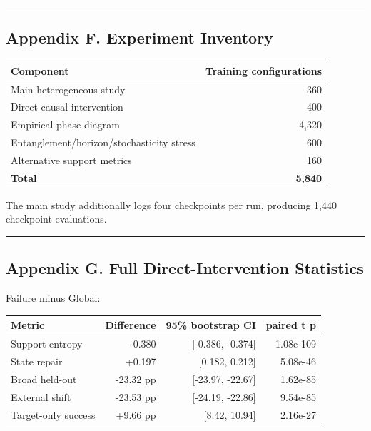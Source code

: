 \documentclass[
]{article}
\begin{document}
\begin{center}\rule{0.5\linewidth}{0.5pt}\end{center}

\subsection{Appendix F. Experiment
Inventory}\label{appendix-f.-experiment-inventory}

\begin{longtable}[]{@{}lr@{}}
\toprule\noalign{}
Component & Training configurations \\
\midrule\noalign{}
\endhead
\bottomrule\noalign{}
\endlastfoot
Main heterogeneous study & 360 \\
Direct causal intervention & 400 \\
Empirical phase diagram & 4,320 \\
Entanglement/horizon/stochasticity stress & 600 \\
Alternative support metrics & 160 \\
\textbf{Total} & \textbf{5,840} \\
\end{longtable}

The main study additionally logs four checkpoints per run, producing
1,440 checkpoint evaluations.

\begin{center}\rule{0.5\linewidth}{0.5pt}\end{center}

\subsection{Appendix G. Full Direct-Intervention
Statistics}\label{appendix-g.-full-direct-intervention-statistics}

Failure minus Global:

\begin{longtable}[]{@{}lrrr@{}}
\toprule\noalign{}
Metric & Difference & 95\% bootstrap CI & paired t p \\
\midrule\noalign{}
\endhead
\bottomrule\noalign{}
\endlastfoot
Support entropy & -0.380 & {[}-0.386, -0.374{]} & 1.08e-109 \\
State repair & +0.197 & {[}0.182, 0.212{]} & 5.08e-46 \\
Broad held-out & -23.32 pp & {[}-23.97, -22.67{]} & 1.62e-85 \\
External shift & -23.53 pp & {[}-24.19, -22.86{]} & 9.54e-85 \\
Target-only success & +9.66 pp & {[}8.42, 10.94{]} & 2.16e-27 \\
\end{longtable}
\end{document}
